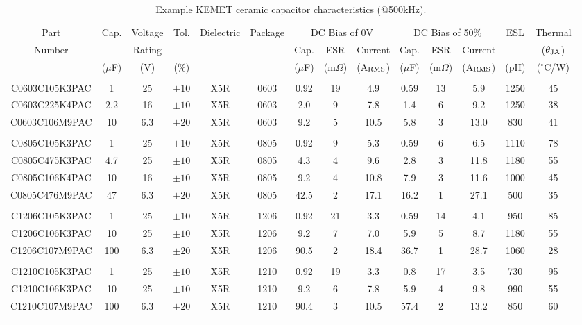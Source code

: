 \documentclass[10pt,twoside]{article}
\begin{document}
\begin{landscape}
\begin{table}[p]
\small
\caption{Example KEMET ceramic capacitor characteristics (@500kHz).}
\label{tab:kemet_caps}
\begin{center}
\begin{tabular}{|c|c|c|c|c|c||c|c|c||c|c|c||c|c|}
\hline
Part   & Cap. & Voltage & Tol. & Dielectric & Package &
\multicolumn{3}{c||}{DC Bias of 0V}  &
\multicolumn{3}{c||}{DC Bias of 50\%} & ESL & Thermal\\
%
\cline{7-12}
Number &   & Rating  &           &            &         &
Cap. & ESR & Current    &
Cap. & ESR & Current    &       & ($\theta_{\rm JA}$)\\
%
       & ($\mu$F) & (V) & (\%) & & & 
($\mu$F) & (m$\Omega$) & (A$_{\rm RMS}$) &
($\mu$F) & (m$\Omega$) & (A$_{\rm RMS}$) & (pH) & ($^\circ$C/W)\\
\hline\hline
&&&&&&&&&&&&&\\
C0603C105K3PAC &   1 &  25 & $\pm10$ & X5R & 0603 &  0.92 & 19 &  4.9 & 0.59 & 13 &  5.9 & 1250 & 45\\
C0603C225K4PAC & 2.2 &  16 & $\pm10$ & X5R & 0603 &  2.0  &  9 &  7.8 & 1.4  &  6 &  9.2 & 1250 & 38\\
C0603C106M9PAC &  10 & 6.3 & $\pm20$ & X5R & 0603 &  9.2  &  5 & 10.5 & 5.8  &  3 & 13.0 &  830 & 41\\
&&&&&&&&&&&&&\\
C0805C105K3PAC &   1 &  25 & $\pm10$ & X5R & 0805 &  0.92 &  9 &  5.3 & 0.59 & 6 &  6.5 & 1110 & 78\\
C0805C475K3PAC & 4.7 &  25 & $\pm10$ & X5R & 0805 &  4.3  &  4 &  9.6 & 2.8  & 3 & 11.8 & 1180 & 55\\
C0805C106K4PAC &  10 &  16 & $\pm10$ & X5R & 0805 &  9.2  &  4 & 10.8 & 7.9  & 3 & 11.6 & 1000 & 45\\
C0805C476M9PAC &  47 & 6.3 & $\pm20$ & X5R & 0805 & 42.5  &  2 & 17.1 & 16.2 & 1 & 27.1 &  500 & 35\\
&&&&&&&&&&&&&\\
C1206C105K3PAC &   1 &  25 & $\pm10$ & X5R & 1206 &  0.92 & 21 &  3.3 & 0.59 & 14 &  4.1 &  950 & 85\\
C1206C106K3PAC &  10 &  25 & $\pm10$ & X5R & 1206 &  9.2  &  7 &  7.0 & 5.9  &  5 &  8.7 & 1180 & 55\\
C1206C107M9PAC & 100 & 6.3 & $\pm20$ & X5R & 1206 & 90.5  &  2 & 18.4 & 36.7 &  1 & 28.7 & 1060 & 28\\
&&&&&&&&&&&&&\\
C1210C105K3PAC &   1 &  25 & $\pm10$ & X5R & 1210 &  0.92 & 19 &  3.3 &  0.8 & 17 &  3.5 &  730 & 95\\
C1210C106K3PAC &  10 &  25 & $\pm10$ & X5R & 1210 &  9.2  &  6 &  7.8 &  5.9 &  4 &  9.8 &  990 & 55\\
C1210C107M9PAC & 100 & 6.3 & $\pm20$ & X5R & 1210 & 90.4  &  3 & 10.5 & 57.4 &  2 & 13.2 &  850 & 60\\
&&&&&&&&&&&&&\\
\hline
\end{tabular}
\end{center}
\end{table}
\end{landscape}
\end{document}
